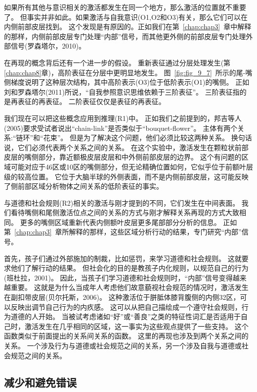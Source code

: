 如果所有其他与意识相关的激活都发生在同一个地方，那么激活的位置就不重要了。
但事实并非如此。如果激活与自我意识(O1,O2和O3)有关，那么它们可以在内侧前部皮层找到。
这个发现是有原因的。正如我们在第~\ref{chap:chap3}~章中解释的那样，内侧前部皮层专门处理“内部”信号，而其他更外侧的前部皮层专门处理外部信号(罗森塔尔，2010)。


在再现的概念背后还有一个进一步的假设。
重新表征通过分层处理发生(第\ref{chap:chap8}章)，高阶表征在分层中更明显地发生。
图~\ref{fig:fig_9_7}~所示的尾-嘴侧梯度说明了这种层次结构，其中高阶表示(O3)位于低阶表示(O1)的嘴侧。
正如刘和罗森塔尔(2011)所说，“自我参照意识思维依赖于三阶表征”。
三阶表征指的是再表征的再表征。
二阶表征仅仅是表征的再表征。


我们现在可以把这些概念应用到推理(R1)中。
正如我们之前提到的，邦吉等人(2005)要求受试者说出“chain-link”是否类似于“bouquet-flower”。
主体有两个关系:“链环”和“花束”。
但是为了解决这个问题，他们必须比较这两种关系。
换句话说，它们必须代表两个关系之间的关系。
在这个实验中，激活发生在颗粒状前部皮层的嘴侧部分，靠近额极皮层皮层和中外侧前部皮层的边界。
这个有问题的区域可能对应于46区或10区的嘴侧部分，但无论精确位置如何，它似乎位于前额叶层级的较高位置。
它位于大脑半球的外侧表面，而不是内侧前部皮层，这可能反映了侧前部区域分析物体之间关系的低阶表征的事实。


与道德和社会规则(R2)相关的激活与刚才提到的不同，它们发生在中间表面。
我们看待嘴侧和尾侧激活位点之间的关系的方式与刚才解释关系再现的方式大致相同。
更多的嘴侧区域重新代表内侧额叶皮层更多尾部部分分析的信息。
正如第~\ref{chap:chap3}~章所解释的那样，这些区域分析行动的结果，专门研究“内部”信号。


首先，孩子们通过外部施加的制裁，比如惩罚，来学习道德和社会规则。
这就要求他们了解行动的结果。
但社会化的目的是教孩子内化规则，以规范自己的行为(班杜拉，2001)。
因此，当孩子们学习道德和社会规则时，“内部”信号变得越来越重要。
这就是为什么当成年人考虑他们故意藐视社会规范的情况时，激活发生在副扣带皮层(贝尔托斯，2006)。
这种激活位于胼胝体膝背腹侧的内侧32区，可以反映出调节自己行为的内疚感。
这可以从把自己描绘成一个遵守社会规则，行为道德的人开始。
当被试考虑诸如“好”或“善良”之类的特征性词汇是否适用于自己时，激活发生在几乎相同的区域，这一事实为这些观点提供了一些支持。
这个函数类似于前面提出的关系间关系的函数。
这里的再现也涉及到两个关系之间的关系。
一个涉及行为与道德或社会规范之间的关系，另一个涉及自我与道德或社会规范之间的关系。


\subsection{减少和避免错误}

